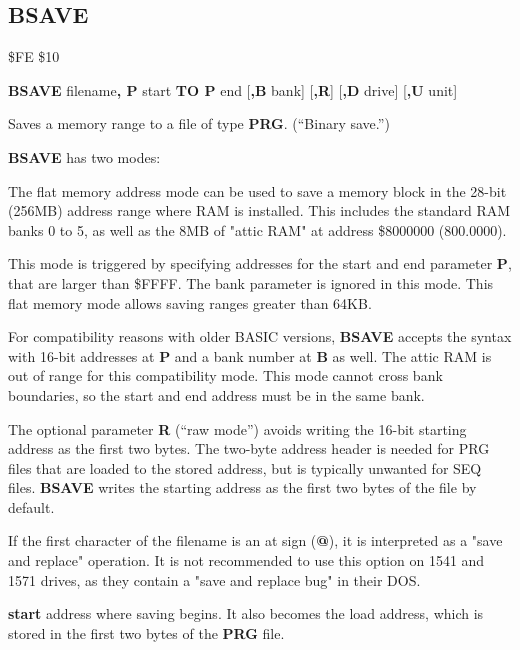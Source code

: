 \subsection{BSAVE}
\begin{description}[leftmargin=2cm,style=nextline]
\item [Token:]    \$FE \$10

\item [Format:]   {\bf BSAVE} filename{\bf, P} start {\bf TO P} end [{\bf,B} bank] [{\bf,R}] [{\bf,D} drive] [{\bf,U} unit]

\item [Usage:]    Saves a memory range to a file of type {\bf PRG}. (``Binary save.'')

                  {\bf BSAVE} has two modes:

                  The flat memory address mode can be used to save a memory block in the 28-bit (256MB) address range where RAM is installed. This includes the standard RAM banks 0 to 5, as well as the 8MB of "attic RAM" at address \$8000000 (800.0000).

                  This mode is triggered by specifying addresses for the start and end parameter {\bf P}, that are larger than \$FFFF. The bank parameter is ignored in this mode. This flat memory mode allows saving ranges greater than 64KB.

                  For compatibility reasons with older BASIC versions, {\bf BSAVE} accepts the syntax with 16-bit addresses at {\bf P} and a bank number at {\bf B} as well. The attic RAM is out of range for this compatibility mode. This mode cannot cross bank boundaries, so the start and end address must be in the same bank.

                  The optional parameter {\bf R} (``raw mode'') avoids writing the 16-bit starting address as the first two bytes. The two-byte address header is needed for PRG files that are loaded to the stored address, but is typically unwanted for SEQ files. {\bf BSAVE} writes the starting address as the first two bytes of the file by default.

                  \filenamedefinition

                  If the first character of the filename is an at sign ({\bf @}), it is interpreted as a "save and replace" operation. It is not recommended to use this option on 1541 and 1571 drives, as they contain a "save and replace bug" in their DOS.

                  {\bf start} address where saving begins. It also becomes the load address, which is stored in the first two bytes of the {\bf PRG} file.


\end{description}
